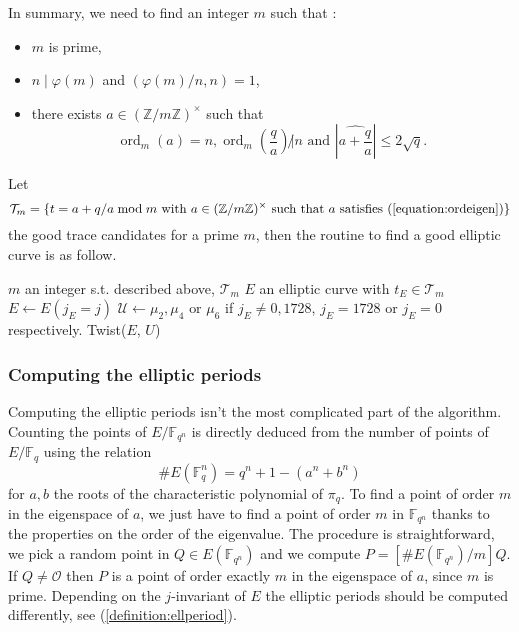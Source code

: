 \documentclass[12pt]{article}
\theoremstyle{plain}
\theoremstyle{definition}
\DeclareMathOperator{\order}{ord} %
\def\Z{\ensuremath{\mathbb{Z}}}
\def\F{\ensuremath{\mathbb{F}}}
\newcounter{algorithm}
\begin{document}
In summary, we need to find an integer $m$ such that :
\begin{itemize}
    \item $m$ is prime,
    \item $n\mid\varphi(m)$ and $(\varphi(m)/n,n)=1$,
    \item there exists $a\in(\Z/m\Z)^{\times}$ such that 
\begin{equation}
\label{equation:ordeigen}
\order_m(a) = n,\order_m(\dfrac{q}{a}) \not| n\text{ and }|\widehat{a + \dfrac{q}{a}}| \leq 2\sqrt{q}.
\end{equation}
\end{itemize}
Let
\begin{equation}
\mathcal{T}_m = \lbrace{t = a + q/a \bmod m \text{ with } a\in(\Z/m\Z)^{\times}
\text{ such that } a \text{ satisfies 
}(\ref{equation:ordeigen})}\rbrace
\end{equation}
the good trace candidates for a prime $m$, then the routine to find a good 
elliptic curve is as follow.

\begin{algorithm}
    \label{algorithm:selectell}
    \begin{algorithmic}[1]
    \REQUIRE $m$ an integer s.t. described above, $\mathcal{T}_m$ 
    \ENSURE $E$ an elliptic curve with $t_E\in\mathcal{T}_m$
    \FOR{$j\in\F_q$}
        \STATE $E \leftarrow E(j_E = j)$ 
        \STATE $\mathcal{U} \leftarrow \mu_2, \mu_4\text{ or }\mu_6$ if 
$j_E\neq0,1728$, $j_E=1728$ or $j_E=0$ respectively.
                    \RETURN Twist($E$, $U$)
                \ENDIF
            \ENDFOR
    \ENDFOR
    \end{algorithmic}
\end{algorithm}

\subsubsection{Computing the elliptic periods}

Computing the elliptic periods isn't the most complicated part of the algorithm.
Counting the points of $E/\F_{q^n}$ is directly deduced from the number of
points of $E/\F_q$ using the relation
\begin{equation}
\#E(\F_q^n)=q^n+1-(a^n+b^n)
\end{equation}
for $a, b$ the roots of the characteristic polynomial of $\pi_q$. To find a
point of order $m$ in the eigenspace of $a$, we just have to find a point of
order $m$ in $\F_{q^n}$ thanks to the properties on the order of the eigenvalue.
The procedure is straightforward, we pick a random point in $Q\in E(\F_{q^n})$
and we compute $P = [\#E(\F_{q^n})/m]Q$. If $Q\neq\mathcal{O}$ then $P$ is a
point of order exactly $m$ in the eigenspace of $a$, since $m$ is prime.
Depending on the $j$-invariant of $E$ the elliptic periods should be computed 
differently, see (\ref{definition:ellperiod}).
 
\end{document}
